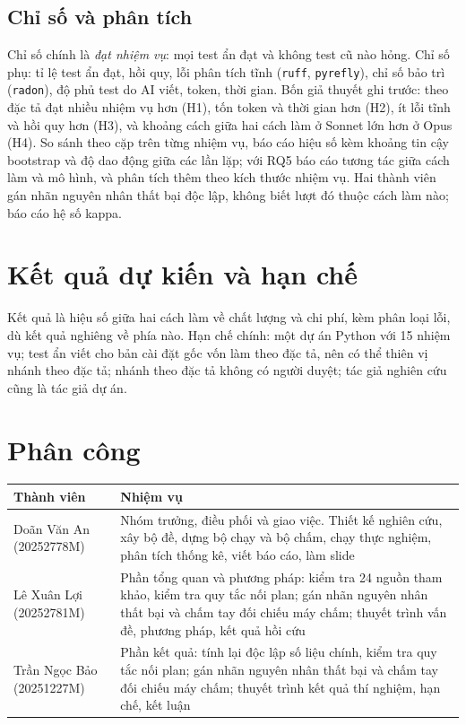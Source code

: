 \documentclass[11pt,a4paper]{article}
\begin{document}
\subsection{Chỉ số và phân tích}
Chỉ số chính là \emph{đạt nhiệm vụ}: mọi test ẩn đạt và không test cũ nào hỏng. Chỉ số phụ: tỉ lệ test
ẩn đạt, hồi quy, lỗi phân tích tĩnh (\texttt{ruff}, \texttt{pyrefly}), chỉ số bảo trì (\texttt{radon}),
độ phủ test do AI viết, token, thời gian. Bốn giả thuyết ghi trước: theo đặc tả đạt nhiều nhiệm vụ hơn
(H1), tốn token và thời gian hơn (H2), ít lỗi tĩnh và hồi quy hơn (H3), và khoảng
cách giữa hai cách làm ở Sonnet lớn hơn ở Opus (H4). So sánh theo cặp trên từng
nhiệm vụ, báo cáo hiệu số kèm khoảng tin cậy bootstrap và độ dao động giữa các lần lặp; với RQ5 báo cáo
tương tác giữa cách làm và mô hình, và phân tích thêm theo kích thước nhiệm vụ. Hai thành viên
gán nhãn nguyên nhân thất bại độc lập, không biết lượt đó thuộc cách làm nào; báo cáo hệ số kappa.

\section{Kết quả dự kiến và hạn chế}
Kết quả là hiệu số giữa hai cách làm về chất lượng và chi phí, kèm phân loại lỗi, dù kết quả nghiêng về
phía nào. Hạn chế chính: một dự án Python với 15 nhiệm vụ; test ẩn viết cho bản cài đặt gốc vốn làm
theo đặc tả, nên có thể thiên vị nhánh theo đặc tả; nhánh theo đặc tả không có người duyệt; tác giả
nghiên cứu cũng là tác giả dự án.

\section{Phân công}
\begin{center}\small
\begin{tabularx}{\linewidth}{@{}lX@{}}
\toprule
Thành viên & Nhiệm vụ \\
\midrule
Doãn Văn An (20252778M) & Nhóm trưởng, điều phối và giao việc. Thiết kế nghiên cứu, xây bộ đề, dựng bộ chạy và bộ chấm, chạy thực nghiệm, phân tích thống kê, viết báo cáo, làm slide \\
Lê Xuân Lợi (20252781M) & Phần tổng quan và phương pháp: kiểm tra 24 nguồn tham khảo, kiểm tra quy tắc nối plan; gán nhãn nguyên nhân thất bại và chấm tay đối chiếu máy chấm; thuyết trình vấn đề, phương pháp, kết quả hồi cứu \\
Trần Ngọc Bảo (20251227M) & Phần kết quả: tính lại độc lập số liệu chính, kiểm tra quy tắc nối plan; gán nhãn nguyên nhân thất bại và chấm tay đối chiếu máy chấm; thuyết trình kết quả thí nghiệm, hạn chế, kết luận \\
\bottomrule
\end{tabularx}
\end{center}

{\small
\renewcommand{\refname}{Tài liệu tham khảo}


}
\end{document}
